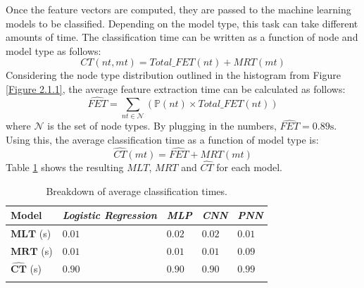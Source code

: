			Once the feature vectors are computed, they are passed to the machine learning models to be classified. Depending on the model type, this task can take different amounts of time. The classification time can be written as a function of node and model type as follows: 
			\begin{equation}
				CT(nt, mt) = Total\_FET(nt) + MRT(mt)
			\end{equation}
			Considering the node type distribution outlined in the histogram from Figure \ref{Figure 2.1.1}, the average feature extraction time can be calculated as follows:
			\begin{equation}
				\hat{FET} = \sum_{nt\in \mathbf{\mathcal{N}}} (\mathbb{P}(nt) \times Total\_FET(nt))
			\end{equation} 
			where $\mathcal{N}$ is the set of node types. By plugging in the numbers, $\hat{FET} = 0.89\text{s}$. Using this, the average classification time as a function of model type is: 
			\begin{equation}
				\hat{CT}(mt) =  \hat{FET} + MRT(mt) 
			\end{equation}  
			 Table \ref{Table: eval/service-time/classification/CT} shows the resulting $MLT$, $MRT$  and $\hat{CT}$ for each model.
			
			\begin{longtable}{|p{.15\textwidth}||p{}|p{}|p{}|p{}|}
				\textbf{Model} & \textit{Logistic Regression} & \textit{MLP} & \textit{CNN} & \textit{PNN} \\
				\hline
				$\mathbf{MLT}$ (s) & $0.01$ & $0.02$ & $0.02$ & $0.01$  \\
				\hline
				$\mathbf{MRT}$ (s) & $0.01$ &$0.01$ & $0.01$ & $0.09$ \\
				\hline\hline
				$\mathbf{\hat{CT}}$ (s) & $\mathbf{0.90}$ & $\mathbf{0.90}$ & $\mathbf{0.90}$ & $\mathbf{0.99}$ \\
				\hline
				\caption{Breakdown of average classification times.}
				\label{Table: eval/service-time/classification/CT}
			\end{longtable} 
			
